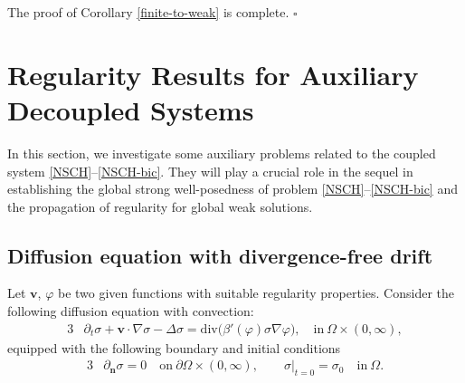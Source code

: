 \documentclass[11pt,reqno]{amsart}
\def\vv{\bm{v}}
\begin{document}
The proof of Corollary \ref{finite-to-weak} is complete.
 \hfill $\square$



\section{Regularity Results for Auxiliary Decoupled Systems}
\label{sec:decoup}
\setcounter{equation}{0}

In this section, we investigate some auxiliary problems related to the coupled system \eqref{NSCH}--\eqref{NSCH-bic}. They will play a crucial role in the
sequel in establishing the global strong well-posedness of problem \eqref{NSCH}--\eqref{NSCH-bic} and the propagation of regularity for global weak solutions.

\subsection{Diffusion equation with divergence-free drift}
\label{sec:reg-sigma}

Let $\vv$, $\varphi$ be two given functions with suitable regularity properties. Consider the following diffusion equation with convection:
%
\begin{alignat}{3}
&\partial_t\sigma +\vv\cdot\nabla\sigma -\Delta\sigma
=  \mathrm{div}\big(\beta'(\varphi)\sigma \nabla \varphi\big),
\quad \text{in}\ \Omega\times (0,\infty),
\label{re-di-sigma}
\end{alignat}
%
equipped with the following boundary and initial conditions
%
\begin{alignat}{3}
&\partial_{\boldsymbol{n}} \sigma =0  \quad \text{on}\ \partial\Omega\times(0,\infty),
\qquad \sigma|_{t=0}=\sigma_{0} \quad \text{in}\ \Omega.
\label{re-di-sigma-bdini}
\end{alignat}
%
\end{document}
